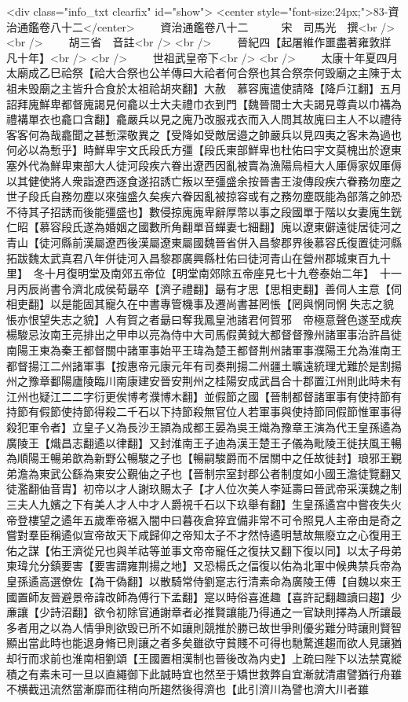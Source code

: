 <div class="info_txt clearfix" id="show">
<center style="font-size:24px;">83-資治通鑑卷八十二</center>
  　　資治通鑑卷八十二　　　宋　司馬光　撰<br />
<br />
　　胡三省　音註<br />
<br />
　　晉紀四【起屠維作噩盡著雍敦牂凡十年】<br />
<br />
　　世祖武皇帝下<br />
<br />
　　太康十年夏四月太廟成乙巳祫祭【祫大合祭也公羊傳曰大祫者何合祭也其合祭奈何毁廟之主陳于太祖未毁廟之主皆升合食於太祖祫胡夾翻】大赦　慕容廆遣使請降【降戶江翻】五月詔拜廆鮮卑都督廆謁見何龕以士大夫禮巾衣到門【魏晉間士大夫謁見尊貴以巾褠為禮褠單衣也龕口含翻】龕嚴兵以見之廆乃改服戎衣而入人問其故廆曰主人不以禮待客客何為哉龕聞之甚慙深敬異之【受降如受敵居邉之帥嚴兵以見四夷之客未為過也何必以為慙乎】時鮮卑宇文氏段氏方彊【段氏東部鮮卑也杜佑曰宇文莫槐出於遼東塞外代為鮮卑東部大人徒河段疾六眷出遼西因亂被賣為漁陽烏桓大人厙傉家奴厙傉以其健使將人衆詣遼西逐食遂招誘亡叛以至彊盛余按晉書王浚傳段疾六眷務勿塵之世子段氏自務勿塵以來強盛久矣疾六眷因亂被掠容或有之務勿塵既能為部落之帥恐不待其子招誘而後能彊盛也】數侵掠廆廆卑辭厚幣以事之段國單于階以女妻廆生皝仁昭【慕容段氏遂為婚姻之國數所角翻單音蟬妻七細翻】廆以遼東僻遠徙居徒河之青山【徒河縣前漢屬遼西後漢屬遼東屬國魏晉省併入昌黎郡界後慕容氏復置徒河縣拓跋魏太武真君八年併徒河入昌黎郡廣興縣杜佑曰徒河青山在營州郡城東百九十里】　冬十月復明堂及南郊五帝位【明堂南郊除五帝座見七十九卷泰始二年】　十一月丙辰尚書令濟北成侯荀朂卒【濟子禮翻】朂有才思【思相吏翻】善伺人主意【伺相吏翻】以是能固其寵久在中書專管機事及遷尚書甚罔悵【罔與惘同惘失志之貌悵亦恨望失志之貌】人有賀之者朂曰奪我鳳皇池諸君何賀邪　帝極意聲色遂至成疾楊駿忌汝南王亮排出之甲申以亮為侍中大司馬假黄鉞大都督督豫州諸軍事治許昌徙南陽王東為秦王都督關中諸軍事始平王瑋為楚王都督荆州諸軍事濮陽王允為淮南王都督揚江二州諸軍事【按惠帝元康元年有司奏荆揚二州疆土曠遠統理尤難於是割揚州之豫章鄱陽廬陵臨川南康建安晉安荆州之桂陽安成武昌合十郡置江州則此時未有江州也疑江二二字衍更俟博考濮博木翻】並假節之國【晉制都督諸軍事有使持節有持節有假節使持節得殺二千石以下持節殺無官位人若軍事與使持節同假節惟軍事得殺犯軍令者】立皇子乂為長沙王頴為成都王晏為吳王熾為豫章王演為代王皇孫遹為廣陵王【熾昌志翻遹以律翻】又封淮南王子迪為漢王楚王子儀為毗陵王徙扶風王暢為順陽王暢弟歆為新野公暢駿之子也【暢嗣駿爵而不居關中之任故徙封】琅邪王覲弟澹為東武公繇為東安公覲伷之子也【晉制宗室封郡公者制度如小國王澹徒覽翻又徒濫翻伷音胄】初帝以才人謝玖賜太子【才人位次美人李延壽曰晉武帝采漢魏之制三夫人九嬪之下有美人才人中才人爵視千石以下玖舉有翻】生皇孫遹宫中嘗夜失火帝登樓望之遹年五歲牽帝裾入闇中曰暮夜倉猝宜備非常不可令照見人主帝由是奇之嘗對羣臣稱遹似宣帝故天下咸歸仰之帝知太子不才然恃遹明慧故無廢立之心復用王佑之謀【佑王濟從兄也與羊祜等並事文帝帝寵任之復扶又翻下復以同】以太子母弟柬瑋允分鎮要害【要害謂雍荆揚之地】又恐楊氏之偪復以佑為北軍中候典禁兵帝為皇孫遹高選僚佐【為干偽翻】以散騎常侍劉寔志行清素命為廣陵王傅【自魏以來王國置師友晉避景帝諱改師為傅行下孟翻】寔以時俗喜進趣【喜許記翻趣讀曰趨】少亷讓【少詩沼翻】欲令初除官通謝章者必推賢讓能乃得通之一官缺則擇為人所讓最多者用之以為人情爭則欲毁已所不如讓則競推於勝已故世爭則優劣難分時讓則賢智顯出當此時也能退身脩已則讓之者多矣雖欲守貧賤不可得也馳騖進趨而欲人見讓猶却行而求前也淮南相劉頌【王國置相漢制也晉後改為内史】上疏曰陛下以法禁寛縱積之有素未可一旦以直繩御下此誠時宜也然至于矯世救弊自宜漸就清肅譬猶行舟雖不横截迅流然當漸靡而往稍向所趨然後得濟也【此引濟川為譬也濟大川者雖
